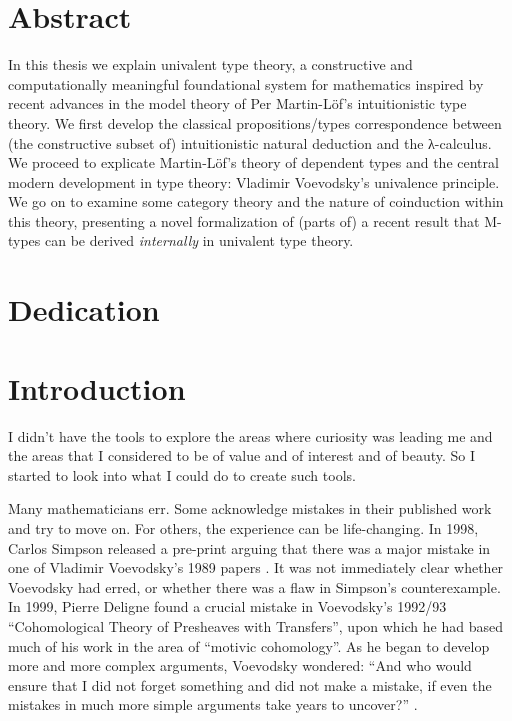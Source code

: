 \documentclass[./thesis.tex]{subfiles}
\begin{document}
\setcounter{tocdepth}{4}
\tableofcontents

\chapter*{Abstract}

In this thesis we explain univalent type theory, a constructive and
computationally meaningful foundational system for mathematics inspired by
recent advances in the model theory of Per Martin-L\"of's intuitionistic type
theory. We first develop the classical propositions/types correspondence between
(the constructive subset of) intuitionistic natural deduction and the
λ-calculus. We proceed to explicate Martin-L\"of's theory of dependent types and
the central modern development in type theory: Vladimir Voevodsky's univalence
principle. We go on to examine some category theory and the nature of coinduction
within this theory, presenting a novel formalization of (parts of) a recent
result that M-types can be derived \textit{internally} in univalent type theory.

\chapter*{Dedication}

\mainmatter %
\pagestyle{fancyplain} %

\chapter*{Introduction}

\setlength{\epigraphwidth}{0.8\textwidth}
\epigraph{I didn’t have the tools to explore the areas where curiosity was
  leading me and the areas that I considered to be of value and of interest and
  of beauty. So I started to look into what I could do to create such tools.}{\cite{voevodsky-ias}}

Many mathematicians err. Some acknowledge mistakes in their published work and
try to move on. For others, the experience can be life-changing. In 1998, Carlos
Simpson released a pre-print arguing that there was a major mistake in one of
Vladimir Voevodsky's 1989 papers \cite{voevodsky-presentation}. It was not
immediately clear whether Voevodsky had erred, or whether there was a flaw in
Simpson's counterexample. In 1999, Pierre Deligne found a crucial mistake in
Voevodsky's 1992/93 ``Cohomological Theory of Presheaves with Transfers'', upon
which he had based much of his work in the area of ``motivic cohomology''. As he
began to develop more and more complex arguments, Voevodsky wondered: ``And who
would ensure that I did not forget something and did not make a mistake, if even
the mistakes in much more simple arguments take years to uncover?''
\cite{voevodsky-ias}.
\end{document}

